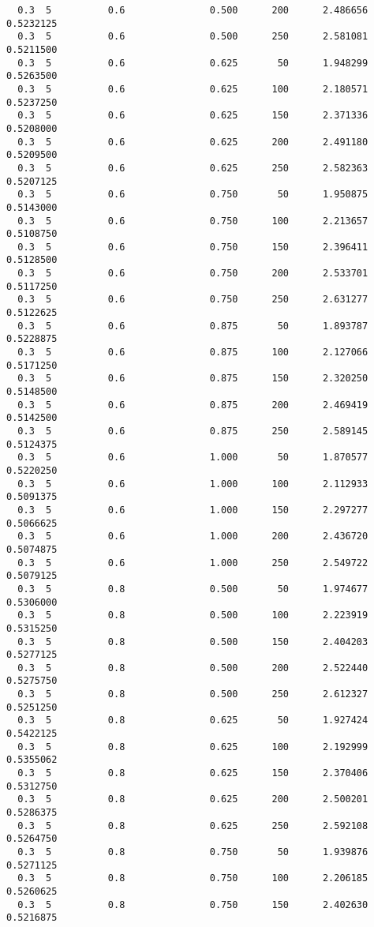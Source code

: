 \documentclass[
  letterpaper,
  DIV=11,
  numbers=noendperiod]{scrartcl}
\begin{document}
\begin{verbatim}
  0.3  5          0.6               0.500      200      2.486656  0.5232125
  0.3  5          0.6               0.500      250      2.581081  0.5211500
  0.3  5          0.6               0.625       50      1.948299  0.5263500
  0.3  5          0.6               0.625      100      2.180571  0.5237250
  0.3  5          0.6               0.625      150      2.371336  0.5208000
  0.3  5          0.6               0.625      200      2.491180  0.5209500
  0.3  5          0.6               0.625      250      2.582363  0.5207125
  0.3  5          0.6               0.750       50      1.950875  0.5143000
  0.3  5          0.6               0.750      100      2.213657  0.5108750
  0.3  5          0.6               0.750      150      2.396411  0.5128500
  0.3  5          0.6               0.750      200      2.533701  0.5117250
  0.3  5          0.6               0.750      250      2.631277  0.5122625
  0.3  5          0.6               0.875       50      1.893787  0.5228875
  0.3  5          0.6               0.875      100      2.127066  0.5171250
  0.3  5          0.6               0.875      150      2.320250  0.5148500
  0.3  5          0.6               0.875      200      2.469419  0.5142500
  0.3  5          0.6               0.875      250      2.589145  0.5124375
  0.3  5          0.6               1.000       50      1.870577  0.5220250
  0.3  5          0.6               1.000      100      2.112933  0.5091375
  0.3  5          0.6               1.000      150      2.297277  0.5066625
  0.3  5          0.6               1.000      200      2.436720  0.5074875
  0.3  5          0.6               1.000      250      2.549722  0.5079125
  0.3  5          0.8               0.500       50      1.974677  0.5306000
  0.3  5          0.8               0.500      100      2.223919  0.5315250
  0.3  5          0.8               0.500      150      2.404203  0.5277125
  0.3  5          0.8               0.500      200      2.522440  0.5275750
  0.3  5          0.8               0.500      250      2.612327  0.5251250
  0.3  5          0.8               0.625       50      1.927424  0.5422125
  0.3  5          0.8               0.625      100      2.192999  0.5355062
  0.3  5          0.8               0.625      150      2.370406  0.5312750
  0.3  5          0.8               0.625      200      2.500201  0.5286375
  0.3  5          0.8               0.625      250      2.592108  0.5264750
  0.3  5          0.8               0.750       50      1.939876  0.5271125
  0.3  5          0.8               0.750      100      2.206185  0.5260625
  0.3  5          0.8               0.750      150      2.402630  0.5216875

\end{verbatim}
\end{document}
